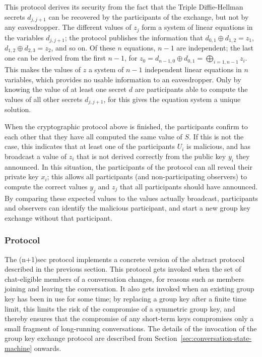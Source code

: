 \documentclass{article}
\def\xor{\oplus}
\begin{document}
This protocol derives its security from the fact that the Triple Diffie-Hellman secrets $d_{j, j+1}$ can be recovered by the participants of the exchange, but not by any eavesdropper.
The different values of $z_j$ form a system of linear equations in the variables $d_{j, j+1}$; the protocol publishes the information that $d_{0, 1} \xor d_{1, 2} = z_{1}$, $d_{1, 2} \xor d_{2, 3} = z_2$, and so on.
Of these $n$ equations, $n - 1$ are independent; the last one can be derived from the first $n - 1$, for $z_0 = d_{n-1, 0} \xor d_{0, 1} = \bigoplus_{i=1, n-1} z_i$.
This makes the values of $z$ a system of $n - 1$ independent linear equations in $n$ variables, which provides no usable information to an eavesdropper.
Only by knowing the value of at least one secret $d$ are participants able to compute the values of all other secrets $d_{j, j+1}$, for this gives the equation system a unique solution.

When the cryptographic protocol above is finished, the participants confirm to each other that they have all computed the same value of $S$.
If this is not the case, this indicates that at least one of the participants $U_i$ is malicious, and has broadcast a value of $z_i$ that is not derived correctly from the public key $y_i$ they announced.
In this situation, the participants of the protocol can all reveal their private key $x_i$; this allows all participants (and non-participating observers) to compute the correct values $y_j$ and $z_j$ that all participants should have announced.
By comparing these expected values to the values actually broadcast, participants and observers can identify the malicious participant, and start a new group key exchange without that participant.


\subsubsection{Protocol}
\label{sec:cryptography/group-key-exchange/protocol}

The (n+1)sec protocol implements a concrete version of the abstract protocol described in the previous section.
This protocol gets invoked when the set of chat-eligible members of a conversation changes, for reasons such as members joining and leaving the conversation.
It also gets invoked when an existing group key has been in use for some time; by replacing a group key after a finite time limit, this limits the risk of the compromise of a symmetric group key, and thereby ensures that the compromise of any short-term keys compromises only a small fragment of long-running conversations.
The details of the invocation of the group key exchange protocol are described from Section~\ref{sec:conversation-state-machine} onwards.
\end{document}
